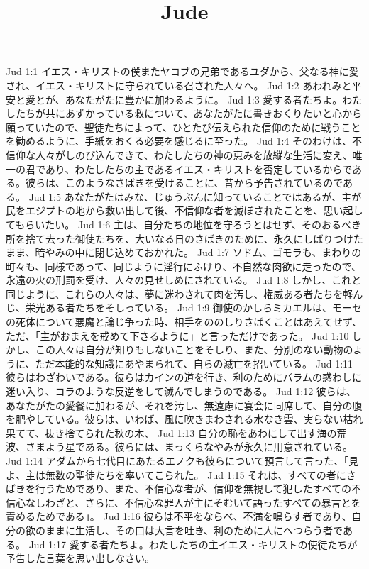 

\title{Jude}

Jud 1:1  イエス・キリストの僕またヤコブの兄弟であるユダから、父なる神に愛され、イエス・キリストに守られている召された人々へ。
Jud 1:2  あわれみと平安と愛とが、あなたがたに豊かに加わるように。
Jud 1:3  愛する者たちよ。わたしたちが共にあずかっている救について、あなたがたに書きおくりたいと心から願っていたので、聖徒たちによって、ひとたび伝えられた信仰のために戦うことを勧めるように、手紙をおくる必要を感じるに至った。
Jud 1:4  そのわけは、不信仰な人々がしのび込んできて、わたしたちの神の恵みを放縦な生活に変え、唯一の君であり、わたしたちの主であるイエス・キリストを否定しているからである。彼らは、このようなさばきを受けることに、昔から予告されているのである。
Jud 1:5  あなたがたはみな、じゅうぶんに知っていることではあるが、主が民をエジプトの地から救い出して後、不信仰な者を滅ぼされたことを、思い起してもらいたい。
Jud 1:6  主は、自分たちの地位を守ろうとはせず、そのおるべき所を捨て去った御使たちを、大いなる日のさばきのために、永久にしばりつけたまま、暗やみの中に閉じ込めておかれた。
Jud 1:7  ソドム、ゴモラも、まわりの町々も、同様であって、同じように淫行にふけり、不自然な肉欲に走ったので、永遠の火の刑罰を受け、人々の見せしめにされている。
Jud 1:8  しかし、これと同じように、これらの人々は、夢に迷わされて肉を汚し、権威ある者たちを軽んじ、栄光ある者たちをそしっている。
Jud 1:9  御使のかしらミカエルは、モーセの死体について悪魔と論じ争った時、相手をののしりさばくことはあえてせず、ただ、「主がおまえを戒めて下さるように」と言っただけであった。
Jud 1:10  しかし、この人々は自分が知りもしないことをそしり、また、分別のない動物のように、ただ本能的な知識にあやまられて、自らの滅亡を招いている。
Jud 1:11  彼らはわざわいである。彼らはカインの道を行き、利のためにバラムの惑わしに迷い入り、コラのような反逆をして滅んでしまうのである。
Jud 1:12  彼らは、あなたがたの愛餐に加わるが、それを汚し、無遠慮に宴会に同席して、自分の腹を肥やしている。彼らは、いわば、風に吹きまわされる水なき雲、実らない枯れ果てて、抜き捨てられた秋の木、
Jud 1:13  自分の恥をあわにして出す海の荒波、さまよう星である。彼らには、まっくらなやみが永久に用意されている。
Jud 1:14  アダムから七代目にあたるエノクも彼らについて預言して言った、「見よ、主は無数の聖徒たちを率いてこられた。
Jud 1:15  それは、すべての者にさばきを行うためであり、また、不信心な者が、信仰を無視して犯したすべての不信心なしわざと、さらに、不信心な罪人が主にそむいて語ったすべての暴言とを責めるためである」。
Jud 1:16  彼らは不平をならべ、不満を鳴らす者であり、自分の欲のままに生活し、その口は大言を吐き、利のために人にへつらう者である。
Jud 1:17  愛する者たちよ。わたしたちの主イエス・キリストの使徒たちが予告した言葉を思い出しなさい。
